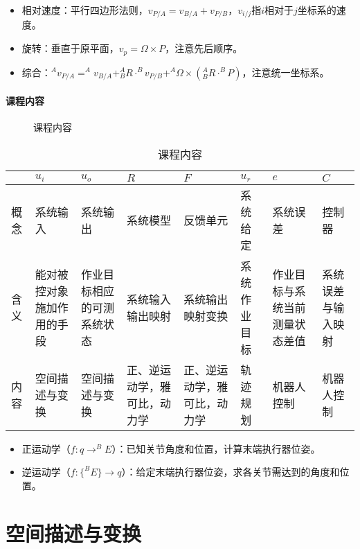 \documentclass[
12pt, %
a4paper, 
oneside, %
headinclude,footinclude, %
]{scrartcl}
\begin{document}
\begin{itemize}
\item 相对速度：平行四边形法则，$ v_{P/A} = v_{B/A} + v_{P/B} $，$ v_{i/j} $指$ i $相对于$ j $坐标系的速度。
\item 旋转：垂直于原平面，$ v_p = \Omega \times P $，注意先后顺序。
\item 综合：$ ^A v_{P/A} = ^A v_{B/A} + ^A_B R \cdot ^B v_{P/B} + ^A \Omega \times (^A_B R \cdot ^B P) $，注意统一坐标系。
\end{itemize}
\paragraph{课程内容}
\begin{figure}[H]
\centering
{} \quad
{}
\caption[课程内容]{课程内容}
\end{figure}

\begin{table}[hbt]
\caption{课程内容}
\centering
\begin{tabular}{|p{0.5cm}|p{2cm}|p{2cm}|p{2cm}|p{2cm}|p{2cm}|p{2cm}|p{2cm}|}
\hline
& $ u_i $ & $ u_o $ & $ R $ & $ F $ & $ u_r $ & $ e $ & $ C $ \\
\hline
概念 & 系统输入 & 系统输出 & 系统模型 & 反馈单元 & 系统给定 & 系统误差 & 控制器 \\
\hline
含义 & 能对被控对象施加作用的手段 & 作业目标相应的可测系统状态 & 系统输入输出映射 & 系统输出映射变换 & 系统作业目标 & 作业目标与系统当前测量状态差值 & 系统误差与输入映射 \\
\hline
内容 & 空间描述与变换 & 空间描述与变换 & 正、逆运动学，雅可比，动力学 & 正、逆运动学，雅可比，动力学 & 轨迹规划 & 机器人控制 & 机器人控制 \\
\hline
\end{tabular}
\end{table}

\begin{itemize}
\item 正运动学（$ f:q \rightarrow ^B E $）：已知关节角度和位置，计算末端执行器位姿。
\item 逆运动学（$ f:\{^B E\} \rightarrow q $）：给定末端执行器位姿，求各关节需达到的角度和位置。
\end{itemize}
\section{空间描述与变换}
\end{document}
